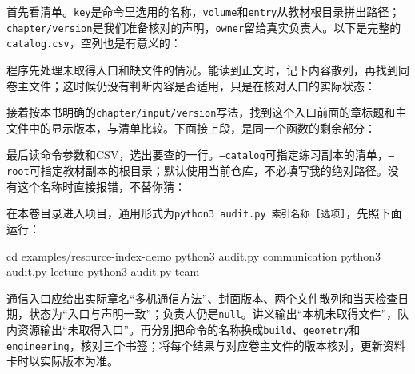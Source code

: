 \begin{example}
首先看清单。\texttt{key}是命令里选用的名称，\texttt{volume}和\texttt{entry}从教材根目录拼出路径；\texttt{chapter/version}是我们准备核对的声明，\texttt{owner}留给真实负责人。以下是完整的\texttt{catalog.csv}，空列也是有意义的：


程序先处理未取得入口和缺文件的情况。能读到正文时，记下内容散列，再找到同卷主文件；这时候仍没有判断内容是否适用，只是在核对入口的实际状态：

\par\vspace{6pt}
\noindent\begin{minipage}[t]{\linewidth}

\end{minipage}\par\vspace{6pt}
接着按本书明确的\texttt{chapter/input/version}写法，找到这个入口前面的章标题和主文件中的显示版本，与清单比较。下面接上段，是同一个函数的剩余部分：

\par\vspace{6pt}
\noindent\begin{minipage}[t]{\linewidth}

\end{minipage}\par\vspace{6pt}
最后读命令参数和CSV，选出要查的一行。\texttt{--catalog}可指定练习副本的清单，\texttt{--root}可指定教材副本的根目录；默认使用当前仓库，不必填写我的绝对路径。没有这个名称时直接报错，不替你猜：

\par\vspace{6pt}
\noindent\begin{minipage}[t]{\linewidth}

\end{minipage}\par\vspace{6pt}
在本卷目录进入项目，通用形式为\texttt{python3 audit.py 索引名称 [选项]}，先照下面运行：
\begin{tbash}
cd examples/resource-index-demo
python3 audit.py communication
python3 audit.py lecture
python3 audit.py team
\end{tbash}
通信入口应给出实际章名“多机通信方法”、封面版本、两个文件散列和当天检查日期，状态为“入口与声明一致”；负责人仍是\texttt{null}。讲义输出“本机未取得文件”，队内资源输出“未取得入口”。再分别把命令的名称换成\texttt{build}、\texttt{geometry}和\texttt{engineering}，核对三个书签；将每个结果与对应卷主文件的版本核对，更新资料卡时以实际版本为准。


\end{example}
